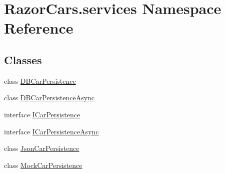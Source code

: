 \hypertarget{namespace_razor_cars_1_1services}{}\section{Razor\+Cars.\+services Namespace Reference}
\label{namespace_razor_cars_1_1services}
\subsection*{Classes}
\begin{DoxyCompactItemize}
\item 
class \mbox{\hyperlink{class_razor_cars_1_1services_1_1_d_b_car_persistence}{D\+B\+Car\+Persistence}}
\item 
class \mbox{\hyperlink{class_razor_cars_1_1services_1_1_d_b_car_persistence_async}{D\+B\+Car\+Persistence\+Async}}
\item 
interface \mbox{\hyperlink{interface_razor_cars_1_1services_1_1_i_car_persistence}{I\+Car\+Persistence}}
\item 
interface \mbox{\hyperlink{interface_razor_cars_1_1services_1_1_i_car_persistence_async}{I\+Car\+Persistence\+Async}}
\item 
class \mbox{\hyperlink{class_razor_cars_1_1services_1_1_json_car_persistence}{Json\+Car\+Persistence}}
\item 
class \mbox{\hyperlink{class_razor_cars_1_1services_1_1_mock_car_persistence}{Mock\+Car\+Persistence}}
\end{DoxyCompactItemize}
